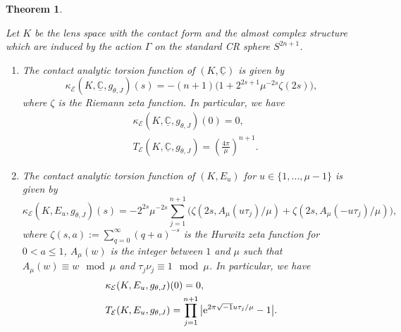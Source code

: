 \documentclass[10pt,a4paper]{amsart}
\numberwithin{equation}{section}
\newtheorem{Theorem}{Theorem}[section]
\newcommand{\ii}{\sqrt{-1}}
\newcommand{\RN}{\cE}
\newcommand{\bC}{\mathbb{C}}
\newcommand{\cE}{\mathcal{E}}
\begin{document}
\begin{Theorem}
\label{theo:compute-precisely-kappa-on-the-lens-spaces}

Let $K$ be the lens space with
the contact form and the almost complex structure which are induced by the action $\Gamma$ on the standard CR sphere $S^{2n+1}$.
\begin{enumerate}\itemsep=0pt
\item[$(1)$]
 The contact analytic torsion function
 of $(K, \underline{\bC})$
 is given by
 \begin{equation}
 \kappa_\RN ( K , \underline{\bC}, g_{\theta , J} ) (s)
 =
 -(n+1)
 \bigr(
 1
 +
 2^{2s+1}
 \mu^{-2s}
 \zeta (2s)
 \bigl)
 ,
 \label{eq:kappa-on-lens-spaces}
 \end{equation}
 where $\zeta$ is the Riemann zeta function.
 In particular, we have
 \begin{align}
 & \kappa_\RN ( K , \underline{\bC} , g_{\theta , J} ) (0)
 =
 0
 ,
 \label{eq:kappa-at-the-origin-of-the-triv-bundle-on-lens-spaces}
 \\
 & T_\RN ( K , \underline{\bC}, g_{\theta , J} )
 =
 \left(\frac{4 \pi}{\mu}\right)^{n+1}
 .
 \label{eq:Rumin-analytic-torsion-of-the-triv-bundle-on-lens-spaces}
 \end{align}

\item[$(2)$]
 The contact analytic torsion function
 of $(K, E_{u})$
 for $u \in \{ 1, \ldots , \mu -1 \} $
 is given by
 \begin{equation}
 \label{eq:kappa-of-flat-bundles-on-lens-spaces}
 \kappa_\RN ( K , E_{u}, g_{\theta , J} ) (s)
 =
 -2^{2s} \mu^{-2s}
 \sum_{j=1}^{n+1}
 \bigl(
 \zeta ( 2s , A_{\mu} (u {\tau}_j) / \mu )
 +
 \zeta ( 2s , A_{\mu} (- u {\tau}_j) / \mu )
 \bigr)
 ,
 \end{equation}
 where $\zeta (s , a) := \sum_{q=0}^{\infty} (q +a )^{-s}$ is the Hurwitz zeta function for $0 < a \leq 1$, $A_{\mu} ( w )$ is the integer between $1$ and $\mu$
 such that $A_{\mu} ( w ) \equiv w \mod \mu$
 and ${\tau}_j \nu_j \equiv 1 \mod \mu$.
 In particular, we have
 \begin{align}
 & \kappa_\RN ( K , E_{u}, g_{\theta , J} ) (0)
 =
 0
 ,
 \label{eq:kappa-at-the-origin-of-flat-vect-bundle-on-lens-spaces}
 \\
 & T_\RN ( K , E_{u}, g_{\theta , J} )
 =
 \prod_{j=1}^{n+1} \big| {\rm e}^{ 2 \pi \ii u {\tau}_j / \mu } -1 \big|
 .
 \label{eq:Rumin-analytic-torsion-of-flat-vect-bundle-on-lens-spaces}
 \end{align}
\end{enumerate}
\end{Theorem}
\end{document}
